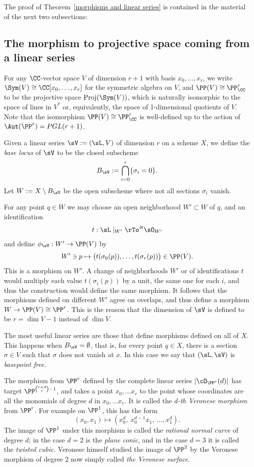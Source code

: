 The proof of Theorem~\ref{morphisms and linear series} is contained in the material of the next two subsections:

\subsection{The morphism to projective space coming from a linear series} 
For any $\CC$-vector space $V$ of dimension $r+1$ with basis $x_{0}, \dots, x_{r}$, we write $\Sym(V) \cong \CC[x_{0},\dots, x_{r}]$ for the symmetric algebra on $V$, and
$\PP(V)\cong \PP^{r}_{\CC}$ to be the projective space ${\rm Proj}(\Sym(V))$, which is naturally isomorphic to the
space of lines in $V^{*}$ or, equivalently,  the space of 1-dimensional quotients of $V$. Note that the isomorphism $\PP(V)\cong \PP^{r}_{\CC}$ is well-defined up to the action
of $\Aut(\PP^r) = PGL(r+1)$.


Given a linear series $\sV:=(\sL, V)$  of dimension $r$ on a scheme $X$, 
we define the \emph{base locus} of $\sV$ to be the closed subscheme 
$$
B_\sV := \bigcap_{i= 0}^{r}\{\sigma_{i} = 0\}.
$$
Let $W:=X\setminus B_\sV$ be the open subscheme where not all sections $\sigma_{i}$ vanish.

For any point $q\in W$ we  may choose an open neighborhood $W'\subset W$ of $q$, and an identification 
$$
t: \sL\mid_{W'} \rTo^{\cong} \sO_{W'}
$$
and define $\phi_{\sV}: W' \to \PP(V)$ by 
$$
W'\ni p \mapsto \bigl(t(\sigma_{0}(p)),\dots, t(\sigma_{r}(p))\bigr) \in \PP(V).
$$
This  is a morphism on $W'$. A change of neighborhoods $W'$ or of identifications $t$ would multiply
each value $t(\sigma_{i}(p))$ by a unit, the same one for each $i$, and thus the construction would define the same morphism. It follows that the morphisms
defined on different $W'$ agree on overlaps, and thus define a morphism $W \to \PP(V) \cong \PP^r$. This is the reason
that the dimension of $\sV$ is defined to be $r=\dim V -1$ instead of $\dim V$.

The most useful linear series are those that define morphisms defined on all of $X$. This happens when $B_\sV = \emptyset$,
that is, for every point $q\in X$, there is a section $\sigma \in V$ such that $\sigma$ does not vanish at $x$. In this case we say that $(\sL, \sV)$ is \emph{basepoint free}.

\begin{example}\label{Veronese definition}
The morphism from $\PP^r$ defined by the complete linear series $|\cO_{\PP^r}(d)|$ has target
$\PP^{{r+d\choose r}-1}$, and takes a point $x_0,\dots x_r$ to the point whose coordinates are all the monomials of
degree $d$ in $x_0,\dots x_r$. It is called the \emph{$d$-th Veronese morphism} from $\PP^r$. For example on $\PP^1$, this has the form
$$
(x_0,x_1) \mapsto (x_0^d,\ x_0^{d-1}x_1,\ \dots,x_1^d).
$$
The image of $\PP^1$ under this morphism is called the \emph{rational normal curve} of degree $d$; in the case $d=2$ is the
\emph{plane conic}, and in the case $d=3$ it is called the \emph{twisted cubic}. Veronese himself studied the image of $\PP^2$
by the Veronese morphism of degree 2 now simply called \emph{the Veronese surface}.
\end{example}


